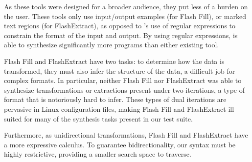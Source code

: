 \documentclass[acmsmall,screen]{acmart}
\begin{document}
As these tools were designed for a broader audience, they put less of a burden
on the user.  These tools only use input/output examples (for Flash
Fill), or marked text regions (for FlashExtract), as opposed
to \Optician{}'s use of regular expressions to constrain the format of
the input and output.  By using regular expressions,
\Optician{} is able to synthesize significantly more programs
than either existing tool.

Flash Fill and FlashExtract have two tasks: to determine how
the data is transformed, they must also infer the structure of the data, a
difficult job for complex formats.
In particular, neither Flash Fill nor FlashExtract was able to synthesize
transformations or extractions present under two iterations, a type of format
that is notoriously hard to infer.
These types of dual iterations are pervasive in Linux configuration
files, making Flash Fill and FlashExtract ill suited for many of the synthesis
tasks present in our test suite.

Furthermore, as unidirectional transformations, Flash Fill and FlashExtract have
a more expressive calculus.  To guarantee bidirectionality, our syntax must be
highly restrictive, providing a smaller search space to traverse.


\end{document}
